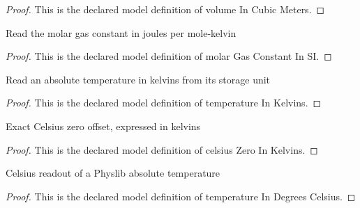 \begin{proof}
  This is the declared model definition of volume In Cubic Meters.
\end{proof}
\begin{definition}
  \label{def:physics:phyx-mini-0441:phyxminiproblems-problemphyxmini0441-molargasconstantinsi}
  Read the molar gas constant in joules per mole-kelvin
\end{definition}
\begin{proof}
  This is the declared model definition of molar Gas Constant In SI.
\end{proof}
\begin{definition}
  \label{def:physics:phyx-mini-0441:phyxminiproblems-problemphyxmini0441-temperatureinkelvins}
  Read an absolute temperature in kelvins from its storage unit
\end{definition}
\begin{proof}
  This is the declared model definition of temperature In Kelvins.
\end{proof}
\begin{definition}
  \label{def:physics:phyx-mini-0441:phyxminiproblems-problemphyxmini0441-celsiuszeroinkelvins}
  Exact Celsius zero offset, expressed in kelvins
\end{definition}
\begin{proof}
  This is the declared model definition of celsius Zero In Kelvins.
\end{proof}
\begin{definition}
  \label{def:physics:phyx-mini-0441:phyxminiproblems-problemphyxmini0441-temperatureindegreescelsius}
  Celsius readout of a Physlib absolute temperature
\end{definition}
\begin{proof}
  This is the declared model definition of temperature In Degrees Celsius.
\end{proof}
